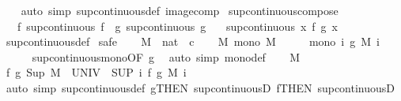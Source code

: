 \begin{isabellebody}
%
\isadelimproof
\ \ %
\endisadelimproof
%
\isatagproof
{}\isamarkupfalse%
\ {\isacharparenleft}auto\ simp{\isacharcolon}\ sup{\isacharunderscore}continuous{\isacharunderscore}def\ image{\isacharunderscore}comp{\isacharparenright}%
\endisatagproof
{\isafoldproof}%
%
\isadelimproof
\isanewline
%
\endisadelimproof
\isanewline
{}\isamarkupfalse%
\ sup{\isacharunderscore}continuous{\isacharunderscore}compose{\isacharcolon}\isanewline
\ \ \ f{\isacharcolon}\ {\isachardoublequoteopen}sup{\isacharunderscore}continuous\ f{\isachardoublequoteclose}\ \ g{\isacharcolon}\ {\isachardoublequoteopen}sup{\isacharunderscore}continuous\ g{\isachardoublequoteclose}\isanewline
\ \ \ {\isachardoublequoteopen}sup{\isacharunderscore}continuous\ {\isacharparenleft}{\isasymlambda}x{\isachardot}\ f\ {\isacharparenleft}g\ x{\isacharparenright}{\isacharparenright}{\isachardoublequoteclose}\isanewline
%
\isadelimproof
\ \ %
\endisadelimproof
%
\isatagproof
{}\isamarkupfalse%
\ sup{\isacharunderscore}continuous{\isacharunderscore}def\isanewline
{}\isamarkupfalse%
\ safe\isanewline
\ \ \isamarkupfalse%
\ M\ {\isacharcolon}{\isacharcolon}\ {\isachardoublequoteopen}nat\ {\isasymRightarrow}\ {\isacharprime}c{\isachardoublequoteclose}\isanewline
\ \ \isamarkupfalse%
\ M{\isacharcolon}\ {\isachardoublequoteopen}mono\ M{\isachardoublequoteclose}\isanewline
\ \ \isamarkupfalse%
\ \isamarkupfalse%
\ {\isachardoublequoteopen}mono\ {\isacharparenleft}{\isasymlambda}i{\isachardot}\ g\ {\isacharparenleft}M\ i{\isacharparenright}{\isacharparenright}{\isachardoublequoteclose}\isanewline
\ \ \ \ \isamarkupfalse%
\ sup{\isacharunderscore}continuous{\isacharunderscore}mono{\isacharbrackleft}OF\ g{\isacharbrackright}\ \isamarkupfalse%
\ {\isacharparenleft}auto\ simp{\isacharcolon}\ mono{\isacharunderscore}def{\isacharparenright}\isanewline
\ \ \isamarkupfalse%
\ M\ \isamarkupfalse%
\ {\isachardoublequoteopen}f\ {\isacharparenleft}g\ {\isacharparenleft}Sup\ {\isacharparenleft}M\ {\isacharbackquote}\ UNIV{\isacharparenright}{\isacharparenright}{\isacharparenright}\ {\isacharequal}\ {\isacharparenleft}SUP\ i{\isachardot}\ f\ {\isacharparenleft}g\ {\isacharparenleft}M\ i{\isacharparenright}{\isacharparenright}{\isacharparenright}{\isachardoublequoteclose}\isanewline
\ \ \ \ \isamarkupfalse%
\ {\isacharparenleft}auto\ simp{\isacharcolon}\ sup{\isacharunderscore}continuous{\isacharunderscore}def\ g{\isacharbrackleft}THEN\ sup{\isacharunderscore}continuousD{\isacharbrackright}\ f{\isacharbrackleft}THEN\ sup{\isacharunderscore}continuousD{\isacharbrackright}{\isacharparenright}\isanewline

\end{isabellebody}
